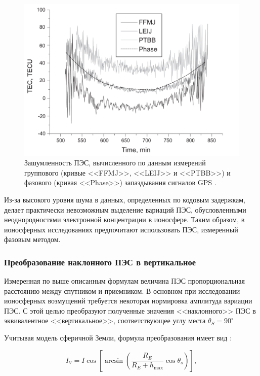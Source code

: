 \documentclass[a4paper]{article}
\begin{document}
\begin{figure}[h]
\centering
\includegraphics[width = 1\linewidth]{pics/pic2.png}
\caption{Зашумленность ПЭС, вычисленного по данным измерений группового (кривые <<FFMJ>>, <<LEIJ>> и <<PTBB>>) и фазового (кривая <<Phase>>) запаздывания сигналов GPS \cite{kozharin}.}
\label{pic2}
\end{figure}

Из-за высокого уровня шума в данных, определенных по кодовым задержкам, делает практически невозможным выделение вариаций ПЭС, обусловленными неоднородностями электронной концентрации в ионосфере. Таким образом, в ионосферных исследованиях предпочитают использовать ПЭС, измеренный фазовым методом. 

\subsubsection{Преобразование наклонного ПЭС  в вертикальное}
Измеренная по выше описанным формулам величина ПЭС пропорциональная расстоянию между спутником и приемником. В основном при исследовании ионосферных возмущений требуется некоторая нормировка амплитуда вариации ПЭС. С этой целью преобразуют полученные значения <<наклонного>> ПЭС в эквивалентное <<вертикальное>>, соответствующее углу места $\theta_S = 90^{\circ}$ 

Учитывая модель сферичной Земли, формула преобразования имеет вид \cite{klobuchar}:

\begin{equation}
I_V = I \cos{\left[ \arcsin{\left( \frac{R_E}{R_E + h_\text{max}} \cos{\theta_s}\right)} \right]},
\label{sfuntion}
\end{equation} 
\end{document}

